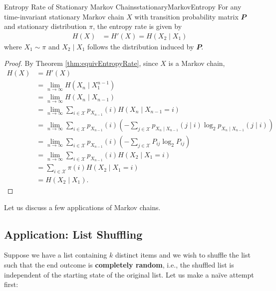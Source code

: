 \documentclass[math, code]{amznotes}
\theoremstyle{remark}
\begin{document}
\begin{probox}{Entropy Rate of Stationary Markov Chains}{stationaryMarkovEntropy}
    For any time-invariant stationary Markov chain $X$ with transition probability matrix $\mathbfit{P}$ and stationary distribution $\pi$, the entropy rate is given by 
    \begin{align*}
        H\left(X\right) & = H'\left(X\right) = H\left(X_2 \mid X_1\right)
    \end{align*}
    where $X_1 \sim \pi$ and $X_2 \mid X_1$ follows the distribution induced by $\mathbfit{P}$.
    \tcblower
    \begin{proof}
        By Theorem \ref{thm:equivEntropyRate}, since $X$ is a Markov chain,
        \begin{align*}
            H\left(X\right) & = H'\left(X\right) \\
            & = \lim_{n \to \infty}H\left(X_n \mid X_1^{n - 1}\right) \\
            & = \lim_{n \to \infty}H\left(X_n \mid X_{n - 1}\right) \\
            & = \lim_{n \to \infty}\sum_{i \in \mathcal{X}}p_{X_{n - 1}}\left(i\right)H\left(X_n \mid X_{n - 1} = i\right) \\
            & = \lim_{n \to \infty}\sum_{i \in \mathcal{X}}p_{X_{n - 1}}\left(i\right)\left(-\sum_{j \in \mathcal{X}}p_{X_n \mid X_{n - 1}}\left(j \mid i\right)\log_2p_{X_n \mid X_{n - 1}}\left(j \mid i\right)\right) \\
            & = \lim_{n \to \infty}\sum_{i \in \mathcal{X}}p_{X_{n - 1}}\left(i\right)\left(-\sum_{j \in \mathcal{X}}P_{ij}\log_2P_{ij}\right) \\
            & = \lim_{n \to \infty}\sum_{i \in \mathcal{X}}p_{X_{n - 1}}\left(i\right)H\left(X_2 \mid X_1 = i\right) \\
            & = \sum_{i \in \mathcal{X}}\pi\left(i\right)H\left(X_2 \mid X_1 = i\right) \\
            & = H\left(X_2 \mid X_1\right).
        \end{align*}
    \end{proof}
\end{probox}
Let us discuss a few applications of Markov chains.
\subsection{Application: List Shuffling}
Suppose we have a list containing $k$ distinct items and we wish to shuffle the list such that the end outcome is \textbf{completely random}, i.e., the shuffled list is independent of the starting state of the original list. Let us make a na\"{i}ve attempt first:
\end{document}
